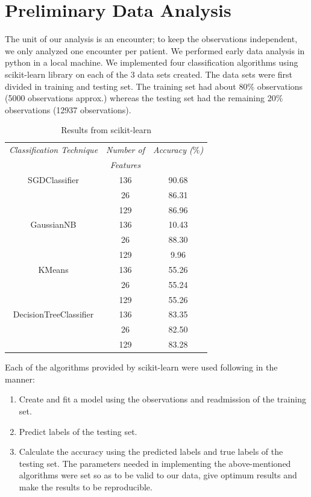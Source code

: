\documentclass[9pt,twocolumn,twoside]{styles/osajnl}
\begin{document}
\section{Preliminary Data Analysis}
The unit of our analysis is an encounter; to keep the observations independent, we only analyzed one encounter per patient.
We performed early data analysis in python in a local machine. We implemented four classification algorithms using scikit-learn library on each of the 3 data sets created. The data sets were first divided in training and testing set. The training set had about 80$\%$ observations (5000 observations approx.) whereas the testing set had the remaining 20$\%$ observations (12937 observations). 
\begin{table}[h!]
\centering
\caption{Results from scikit-learn}
 \begin{tabular}{|c c c|} 
 \hline
 \textit{Classification Technique} & \textit{Number of} & \textit{Accuracy ($\%$)}\\ 
 & \textit{Features} &\\
 \hline
 \hline 
  SGDClassifier\cite{www-sgd} & 136 & 90.68 \\  & 26 & 86.31\\
  & 129 & 86.96\\
 \hline 
  GaussianNB\cite{www-gnb} & 136 & 10.43 \\  & 26 & 88.30\\
  & 129 & 9.96\\ 
 \hline 
   KMeans\cite{www-kmeans} & 136 & 55.26 \\ 
   & 26 & 55.24\\
  & 129 & 55.26\\ 
 \hline 
DecisionTreeClassifier\cite{www-dtc} & 136 & 83.35 \\ & 26 & 82.50\\
  & 129 & 83.28\\
\hline 
\end{tabular}
\label{table:sklearn}
\end{table}


Each of the algorithms provided by scikit-learn were used following in the manner:
\begin{enumerate}
\item Create and fit a model using the observations and readmission of the training set.
\item Predict labels of the testing set.
\item Calculate the accuracy using the predicted labels and true labels of the testing set. The parameters needed in implementing the above-mentioned algorithms were set so as to be valid to our data, give optimum results and make the results to be reproducible.
\end{enumerate}
\end{document}
